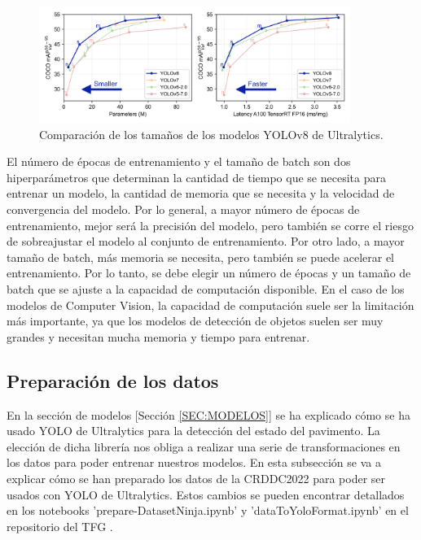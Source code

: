 \begin{figure}[H]
    \centering
    \includegraphics[width=0.9\textwidth]{graphs/yolo-comparison-plots.png}
    \caption{Comparación de los tamaños de los modelos YOLOv8 de Ultralytics.}
    \label{fig:yolo-comparison-plots}
\end{figure}

El número de épocas de entrenamiento y el tamaño de batch son dos hiperparámetros que determinan la cantidad de tiempo que se necesita para entrenar un modelo, la cantidad de memoria que se necesita y la velocidad de convergencia del modelo. Por lo general, a mayor número de épocas de entrenamiento, mejor será la precisión del modelo, pero también se corre el riesgo de sobreajustar el modelo al conjunto de entrenamiento. Por otro lado, a mayor tamaño de batch, más memoria se necesita, pero también se puede acelerar el entrenamiento. Por lo tanto, se debe elegir un número de épocas y un tamaño de batch que se ajuste a la capacidad de computación disponible. En el caso de los modelos de Computer Vision, la capacidad de computación suele ser la limitación más importante, ya que los modelos de detección de objetos suelen ser muy grandes y necesitan mucha memoria y tiempo para entrenar.

\subsection{Preparación de los datos}
En la sección de modelos [Sección \ref{SEC:MODELOS}] se ha explicado cómo se ha usado YOLO de Ultralytics para la detección del estado del pavimento. La elección de dicha librería nos obliga a realizar una serie de transformaciones en los datos para poder entrenar nuestros modelos. En esta subsección se va a explicar cómo se han preparado los datos de la CRDDC2022 para poder ser usados con YOLO de Ultralytics. Estos cambios se pueden encontrar detallados en los notebooks 'prepare-DatasetNinja.ipynb' y 'dataToYoloFormat.ipynb' en el repositorio del TFG \cite{TFG_Repository}.


